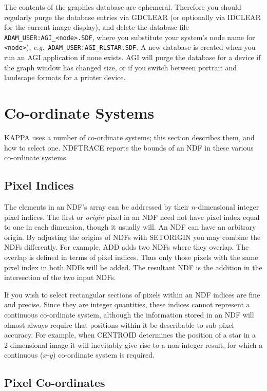 {The contents of the graphics database are ephemeral.  Therefore you
should regularly purge the database entries via GDCLEAR (or optionally
via IDCLEAR for the current image display), and delete the database file
{\tt ADAM\_USER:AGI\_<node>.SDF}, where you substitute your system's
node name for {\tt <node>}), {\it e.g.}\ {\tt ADAM\_USER:AGI\_RLSTAR.SDF}.
A new database is created when you run an AGI application if none
exists.  AGI will purge the database for a device if the graph window
has changed size, or if you switch between portrait and landscape
formats for a printer device. 

\section{Co-ordinate Systems}
\label{se:co-ordsystem}

{\small KAPPA} uses a number of co-ordinate systems; this section
describes them, and how to select one.  NDFTRACE reports the bounds
of an NDF in these various co-ordinate systems. 

\subsection{Pixel Indices}

The elements in an NDF's array can be addressed by their
$n$-dimensional integer pixel indices.  The first or {\em origin\/}
pixel in an NDF need not have pixel index equal to one in each
dimension, though it usually will.  An NDF can have an arbitrary
origin.  By adjusting the origins of NDFs with SETORIGIN you may
combine the NDFs differently.  For example, ADD adds two NDFs where
they overlap. The overlap is defined in terms of pixel indices. 
Thus only those pixels with the same pixel index in both NDFs will
be added.  The resultant NDF is the addition in the intersection of
the two input NDFs. 

If you wish to select rectangular sections of pixels within an NDF
indices are fine and precise.  Since they are integer quantities,
these indices cannot represent a continuous co-ordinate system,
although the information stored in an NDF will almost always require
that positions within it be describable to sub-pixel accuracy.  For
example, when CENTROID determines the position of a star in a
2-dimensional image it will inevitably give rise to a non-integer
result, for which a continuous ($x$-$y$) co-ordinate system is required.

\subsection{Pixel Co-ordinates}
\label{se:pixelco-ordinates}

}
